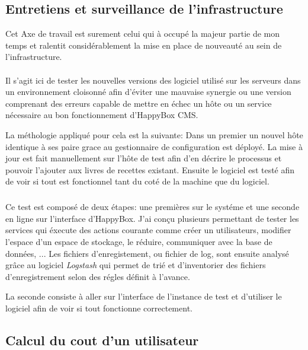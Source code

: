 \documentclass[11pt, a4paper ]{article}
\begin{document}
\begin{spacing}{1.5}
\subsection{Entretiens et surveillance de l'infrastructure}

Cet Axe de travail est surement celui qui à occupé la majeur partie de mon temps et ralentit considérablement la mise en place de nouveauté au sein de l'infrastructure. 

\paragraph{}
Il s'agit ici de tester les nouvelles versions des logiciel utilisé sur les serveurs dans un environnement cloisonné afin d'éviter une mauvaise synergie ou une version comprenant des erreurs capable de mettre en échec un hôte ou un service nécessaire au bon fonctionnement d'HappyBox CMS.

La méthologie appliqué pour cela est la suivante: 
Dans un premier un nouvel hôte identique à ses paire grace au gestionnaire de configuration est déployé. La mise à jour est fait manuellement sur l'hôte de test afin d'en décrire le processus et pouvoir l'ajouter aux livres de recettes existant. 
Ensuite le logiciel est testé afin de voir si tout est fonctionnel tant du coté de la machine que du logiciel. 

\subparagraph{}
Ce test est composé de deux étapes: une premières sur le systéme et une seconde en ligne sur l'interface d'HappyBox. J'ai conçu plusieurs permettant de tester les services qui éxecute des actions courante comme créer un utilisateurs, modifier l'espace d'un espace de stockage, le réduire, communiquer avec la base de données, ...
Les fichiers d'enregistement, ou fichier de log, sont ensuite analysé grâce au logiciel \emph{Logstash} qui permet de trié et d'inventorier des fichiers d'enregistrement selon des régles définit à l'avance.

La seconde consiste à aller sur l'interface de l'instance de test et d'utiliser le logiciel afin de voir si tout fonctionne correctement.


\subsection{Calcul du cout d'un utilisateur}

\end{spacing}
\end{document}
